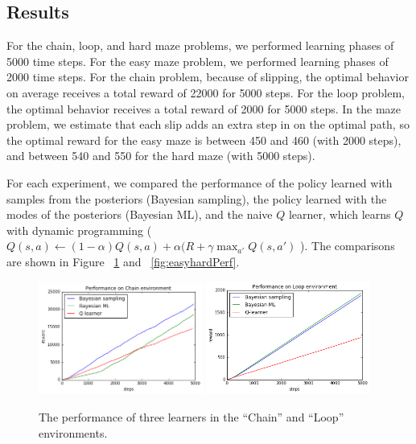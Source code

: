 \documentclass[10pt, twocolumn, twoside]{article}
\begin{document}
\subsection{Results}
For the chain, loop, and hard maze problems, we performed learning phases of 5000 time steps. For
the easy maze problem, we performed learning phases of 2000 time steps. For the chain problem,
because of slipping, the optimal behavior on average receives a total reward of 22000 for
5000 steps. For the loop problem, the optimal behavior receives a total reward of 2000
for 5000 steps. In the maze problem, we estimate that each slip adds an extra step in on the optimal
path, so the optimal reward for the easy maze is between 450 and 460 (with 2000 steps),
and between 540 and 550 for the hard maze (with 5000 steps).

For each experiment, we compared the performance of the policy learned with samples from the posteriors
(Bayesian sampling), the policy learned with the modes of the posteriors (Bayesian ML), and the naive $Q$
learner, which learns $Q$ with dynamic programming (
$Q(s, a) \leftarrow (1 - \alpha)Q(s,a) + \alpha(R + \gamma \max_{a'}Q(s, a')$
). The comparisons are shown in Figure ~\ref{fig:chainloopPerf} and
~\ref{fig:easyhardPerf}.

\begin{figure}[!htb]
\centering
\includegraphics[width=0.48\textwidth]{chainPerf.png}
\includegraphics[width=0.48\textwidth]{loopPerf.png}
\caption{\label{fig:chainloopPerf} The performance of three learners in the ``Chain'' and ``Loop''
environments.}
\end{figure}
\end{document}
